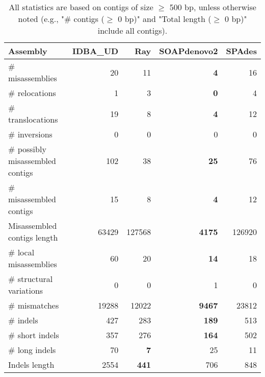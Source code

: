 \documentclass[12pt,a4paper]{article}
\begin{document}
\begin{table}[ht]
\begin{center}
\caption{All statistics are based on contigs of size $\geq$ 500 bp, unless otherwise noted (e.g., "\# contigs ($\geq$ 0 bp)" and "Total length ($\geq$ 0 bp)" include all contigs).}
\begin{tabular}{|l*{4}{|r}|}
\hline
Assembly & IDBA\_UD & Ray & SOAPdenovo2 & SPAdes \\ \hline
\# misassemblies & 20 & 11 & {\bf 4} & 16 \\ \hline
\hspace{5mm}\# relocations & 1 & 3 & {\bf 0} & 4 \\ \hline
\hspace{5mm}\# translocations & 19 & 8 & {\bf 4} & 12 \\ \hline
\hspace{5mm}\# inversions & 0 & 0 & 0 & 0 \\ \hline
\# possibly misassembled contigs & 102 & 38 & {\bf 25} & 76 \\ \hline
\# misassembled contigs & 15 & 8 & {\bf 4} & 12 \\ \hline
Misassembled contigs length & 63429 & 127568 & {\bf 4175} & 126920 \\ \hline
\# local misassemblies & 60 & 20 & {\bf 14} & 18 \\ \hline
\# structural variations & 0 & 0 & 1 & 0 \\ \hline
\# mismatches & 19288 & 12022 & {\bf 9467} & 23812 \\ \hline
\# indels & 427 & 283 & {\bf 189} & 513 \\ \hline
\hspace{5mm}\# short indels & 357 & 276 & {\bf 164} & 502 \\ \hline
\hspace{5mm}\# long indels & 70 & {\bf 7} & 25 & 11 \\ \hline
Indels length & 2554 & {\bf 441} & 706 & 848 \\ \hline
\end{tabular}
\end{center}
\end{table}
\end{document}
